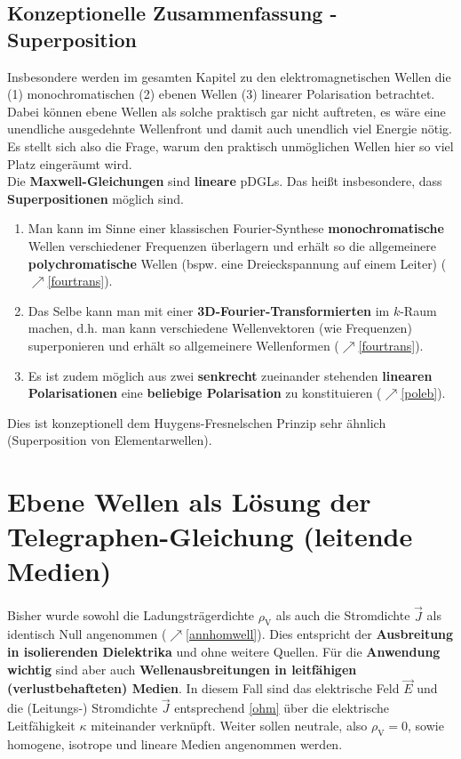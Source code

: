 \subsection{Konzeptionelle Zusammenfassung - Superposition}
Insbesondere werden im gesamten Kapitel zu den elektromagnetischen Wellen die (1) monochromatischen (2) ebenen Wellen (3) linearer Polarisation betrachtet. Dabei können ebene Wellen als solche praktisch gar nicht auftreten, es wäre eine unendliche ausgedehnte Wellenfront und damit auch unendlich viel Energie nötig. Es stellt sich also die Frage, warum den praktisch unmöglichen Wellen hier so viel Platz eingeräumt wird.\\
Die \textbf{Maxwell-Gleichungen} sind \textbf{lineare} pDGLs. Das heißt insbesondere, dass \textbf{Superpositionen} möglich sind.
\begin{enumerate}
	\item Man kann im Sinne einer klassischen Fourier-Synthese \textbf{monochromatische} Wellen verschiedener Frequenzen überlagern und erhält so die allgemeinere \textbf{polychromatische} Wellen (bspw. eine Dreieckspannung auf einem Leiter) ($\nearrow$\ref{fourtrans}).
	\item Das Selbe kann man mit einer \textbf{3D-Fourier-Transformierten} im $k$-Raum machen, d.h. man kann verschiedene Wellenvektoren (wie Frequenzen) superponieren und erhält so allgemeinere Wellenformen ($\nearrow$\ref{fourtrans}).
	\item Es ist zudem möglich aus zwei \textbf{senkrecht} zueinander stehenden \textbf{linearen Polarisationen} eine \textbf{beliebige Polarisation} zu konstituieren ($\nearrow$\ref{poleb}).
\end{enumerate}
Dies ist konzeptionell dem Huygens-Fresnelschen Prinzip sehr ähnlich (Superposition von Elementarwellen). 
 \section{Ebene Wellen als Lösung der Telegraphen-Gleichung (leitende Medien)}\label{leitendeMed}
 Bisher wurde sowohl die Ladungsträgerdichte \(\rho_\text{V}\) als auch die Stromdichte \(\vec{J}\) als identisch Null angenommen ($\nearrow$\ref{annhomwell}). Dies entspricht der \textbf{Ausbreitung in isolierenden Dielektrika} und ohne weitere Quellen. Für die \textbf{Anwendung wichtig} sind aber auch \textbf{Wellenausbreitungen in leitfähigen (verlustbehafteten) Medien}. In diesem Fall sind das elektrische Feld \(\vec{E}\) und die (Leitungs-) Stromdichte \(\vec{J}\) entsprechend \ref{ohm} über die elektrische Leitfähigkeit \(\kappa\) miteinander verknüpft. Weiter sollen neutrale, also \(\rho_\text{V} = 0\), sowie homogene, isotrope und lineare Medien angenommen werden.
